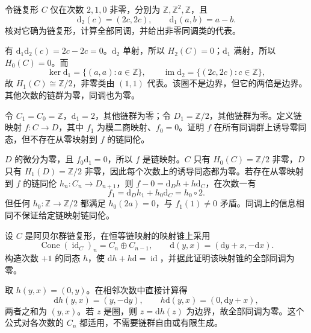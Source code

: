 \begin{exercise}\label{g2:ex:torsion-chain-calculation}
	令链复形 \(C\) 仅在次数 \(2,1,0\) 非零，分别为 \(\mathbb Z,\mathbb Z^2,\mathbb Z\)，且
	\[
		\mathrm{d}_2(c)=(2c,2c),\qquad \mathrm{d}_1(a,b)=a-b.
	\]
	核对它确为链复形，计算全部同调，并给出非零同调类的代表。
\end{exercise}
\begin{solution}
	有 \(\mathrm{d}_1\mathrm{d}_2(c)=2c-2c=0\)。\(\mathrm{d}_2\) 单射，所以 \(H_2(C)=0\)；\(\mathrm{d}_1\) 满射，所以 \(H_0(C)=0\)。而
	\[
		\ker\mathrm{d}_1=\{(a,a):a\in\mathbb Z\},\qquad
		\operatorname{im}\mathrm{d}_2=\{(2c,2c):c\in\mathbb Z\},
	\]
	故 \(H_1(C)\cong\mathbb Z/2\)，非零类由 \((1,1)\) 代表。该圈不是边界，但它的两倍是边界。其他次数的链群为零，同调也为零。
\end{solution}

\begin{exercise}\label{g2:ex:homology-zero-not-chain-null}
	令 \(C_1=C_0=\mathbb Z\)，\(\mathrm{d}_1=2\)，其他链群为零；令 \(D_1=\mathbb Z/2\)，其他链群为零。定义链映射 \(f:C\to D\)，其中 \(f_1\) 为模二商映射、\(f_0=0\)。证明 \(f\) 在所有同调群上诱导零同态，但不存在从零映射到 \(f\) 的链同伦。
\end{exercise}
\begin{solution}
	\(D\) 的微分为零，且 \(f_0\mathrm{d}_1=0\)，所以 \(f\) 是链映射。\(C\) 只有 \(H_0(C)=\mathbb Z/2\) 非零，\(D\) 只有 \(H_1(D)=\mathbb Z/2\) 非零，因此每个次数上的诱导同态都为零。若存在从零映射到 \(f\) 的链同伦 \(h_n:C_n\to D_{n+1}\)，则 \(f-0=\mathrm{d}_Dh+h\mathrm{d}_C\)，在次数一有
	\[
		f_1=\mathrm{d}_Dh_1+h_0\mathrm{d}_C=h_0\circ2.
	\]
	但任何 \(h_0:\mathbb Z\to\mathbb Z/2\) 都满足 \(h_0(2a)=0\)，与 \(f_1(1)\ne0\) 矛盾。同调上的信息相同不保证给定链映射链同伦。
\end{solution}

\begin{exercise}\label{g2:ex:identity-cone-contraction}
	设 \(C\) 是阿贝尔群链复形，在恒等链映射的映射锥上采用
	\[
		\operatorname{Cone}(\operatorname{id}_C)_n=C_n\oplus C_{n-1},
		\qquad \mathrm{d}(y,x)=(\mathrm{d}y+x,-\mathrm{d}x).
	\]
	构造次数 \(+1\) 的同态 \(h\)，使 \(\mathrm{d}h+h\mathrm{d}=\operatorname{id}\)，并据此证明该映射锥的全部同调为零。
\end{exercise}
\begin{solution}
	取 \(h(y,x)=(0,y)\)。在相邻次数中直接计算得
	\[
		\mathrm{d}h(y,x)=(y,-\mathrm{d}y),\qquad h\mathrm{d}(y,x)=(0,\mathrm{d}y+x),
	\]
	两者之和为 \((y,x)\)。若 \(z\) 是圈，则 \(z=\mathrm{d}h(z)\) 为边界，故全部同调为零。这个公式对各次数的 \(C_n\) 都适用，不需要链群自由或有限生成。
\end{solution}

